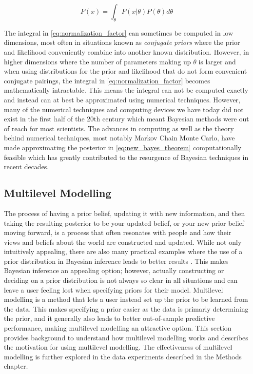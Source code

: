 \begin{equation} \label{eq:normalization_factor}
P(x) = \int_{\theta} P(x|\theta)P(\theta) d\theta
\end{equation}

The integral in \ref{eq:normalization_factor} can sometimes be computed in low dimensions, most often in situations known as \textit{conjugate priors} where the prior and likelihood conveniently combine into another known distribution. However, in higher dimensions where the number of parameters making up $\theta$ is larger and when using distributions for the prior and likelihood that do not form convenient conjugate pairings, the integral in \ref{eq:normalization_factor} becomes mathematically intractable. This means the integral can not be computed exactly and instead can at best be approximated using numerical techniques. However, many of the numerical techniques and computing devices we have today did not exist in the first half of the 20th century which meant Bayesian methods were out of reach for most scientists. The advances in computing as well as the theory behind numerical techniques, most notably Markov Chain Monte Carlo, have made approximating the posterior in \ref{eq:new_bayes_theorem} computationally feasible which has greatly contributed to the resurgence of Bayesian techniques in recent decades.

\subsection{Multilevel Modelling} \label{Multilevel_Modelling}

The process of having a prior belief, updating it with new information, and then taking the resulting posterior to be your updated belief, or your new prior belief moving forward, is a process that often resonates with people and how their views and beliefs about the world are constructed and updated. While not only intuitively appealing, there are also many practical examples where the use of a prior distribution in Bayesian inference leads to better results \cite{Schoot2021}. This makes Bayesian inference an appealing option; however, actually constructing or deciding on a prior distribution is not always so clear in all situations and can leave a user feeling lost when specifying priors for their model. Multilevel modelling is a method that lets a user instead set up the prior to be learned from the data. This makes specifying a prior easier as the data is primarly determining the prior, and it generally also leads to better out-of-sample predictive performance, making multilevel modelling an attractive option. This section provides background to understand how multilevel modelling works and describes the motivation for using multilevel modelling. The effectiveness of multilevel modelling is further explored in the data experiments described in the Methods chapter.

